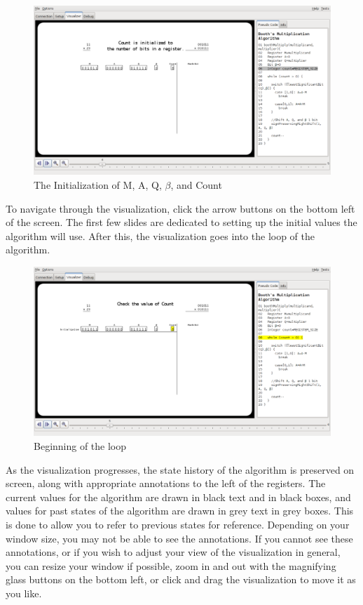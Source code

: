 \documentclass{article}
\begin{document}
\begin{figure}[h]
\centering
\includegraphics[scale=0.3]{initreg.pdf}
\caption{The Initialization of M, A, Q, $\beta$, and Count}%
\end{figure}

To navigate through the visualization, click the arrow buttons on the bottom left of the screen.
The first few slides are dedicated to setting up the initial values the algorithm will use.
After this, the visualization goes into the loop of the algorithm.

\pagebreak
\begin{figure}[h]
\centering
\includegraphics[scale=0.3]{looptop.pdf}
\caption{Beginning of the loop}
\end{figure}

As the visualization progresses, the state history of the algorithm is preserved on screen, along with appropriate annotations to the left of the registers.
The current values for the algorithm are drawn in black text and in black boxes, and values for past states of the algorithm are drawn in grey text in grey boxes.
This is done to allow you to refer to previous states for reference.
Depending on your window size, you may not be able to see the annotations.
If you cannot see these annotations, or if you wish to adjust your view of the visualization in general, you can resize your window if possible, zoom in and out with the magnifying glass buttons on the bottom left, or click and drag the visualization to move it as you like.
\end{document}
